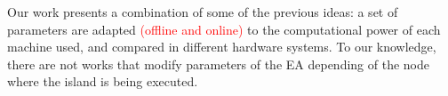 \documentclass[final,1p,times]{elsarticle}
\begin{document}
 Our work presents a combination of some of the previous ideas: a set of parameters are adapted \textcolor{red}{(offline and online)} to the computational power of each machine used, and compared in different hardware systems.
 To our knowledge, there are not works that
 modify parameters of the EA depending of the
 node where the island is being executed. 







\end{document}
